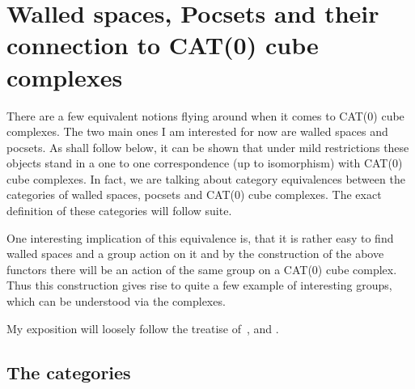 
\section{Walled spaces, Pocsets and their connection to CAT(0) cube complexes}
\label{sec:walls}

There are a few equivalent notions flying around when it comes to CAT(0) cube complexes. The two main ones I am interested for now are walled spaces and pocsets. As shall follow below, it can be shown that under mild restrictions these objects stand in a one to one correspondence (up to isomorphism) with CAT(0) cube complexes. In fact, we are talking about category equivalences between the categories of walled spaces, pocsets and CAT(0) cube complexes. The exact definition of these categories will follow suite.

One interesting implication of this equivalence is, that it is rather easy to find walled spaces and a group action on it and by the construction of the above functors there will be an action of the same group on a CAT(0) cube complex. Thus this construction gives rise to quite a few example of interesting groups, which can be understood via the complexes.

My exposition will loosely follow the treatise of~\textcite{Nica2004}, \textcite{MR1347406} and \textcite{Roller1999}.

\subsection{The categories}
\label{sec:cat}


